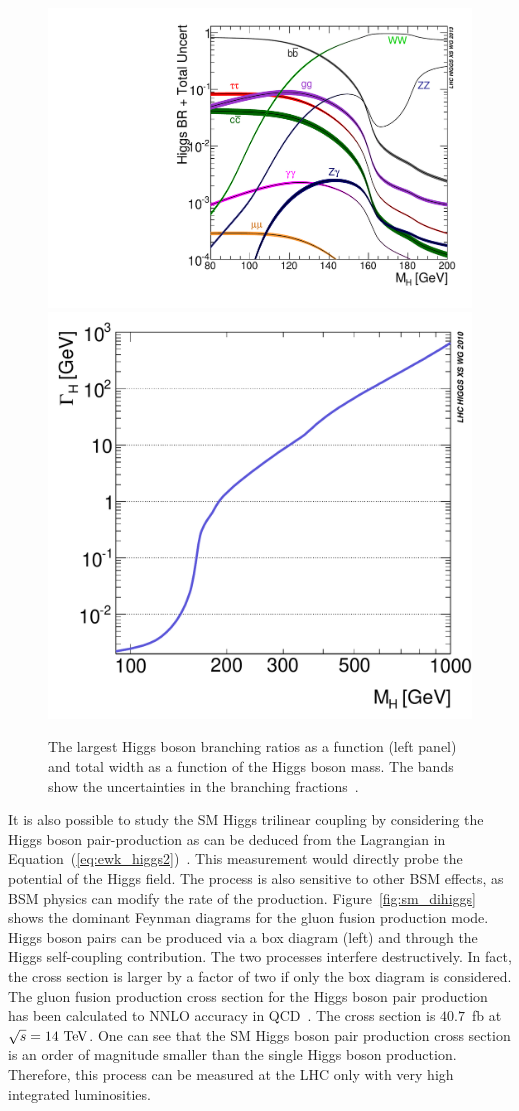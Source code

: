 \begin{figure}[h]
\centering
\includegraphics[width=0.49\columnwidth]{figures_chapter2/Higgs_BR_LM}
\includegraphics[width=0.49\columnwidth]{figures_chapter2/YRHXS_BR_fig2}
\caption{The largest Higgs boson branching ratios as a function (left panel) and total width as a function of the Higgs boson mass. The bands show the uncertainties in the branching fractions~\cite{Dittmaier:2011ti,Dittmaier:2012vm,Heinemeyer:2013tqa}.} 
\label{fig:higgs_decay}
\end{figure} 

It is also possible to study the SM Higgs trilinear coupling by considering the Higgs boson pair-production as can be deduced from the Lagrangian in Equation~(\ref{eq:ewk_higgs2})~\cite{Glover:1987nx,Plehn:1996wb,Djouadi:1999rca,Gianotti:2002xx,Baur:2003gpa,Baur:2003gp,Baglio:2012np}. This measurement would directly probe the potential of the Higgs field. The process is also sensitive to other BSM effects, as BSM physics can modify the rate of the production. Figure~\ref{fig:sm_dihiggs} shows the dominant Feynman diagrams for the gluon fusion production mode. Higgs boson pairs can be produced via a box diagram (left) and through the Higgs self-coupling contribution. The two processes interfere destructively. In fact, the cross section is larger by a factor of two if only the box diagram is considered. The gluon fusion production cross section for the Higgs boson pair production has been calculated to NNLO accuracy in QCD~\cite{Dawson:1998py,Grigo:2014jma}. The cross section is $40.7$~fb at $\sqrt{s}=14~\mathrm{Te\kern -0.1em V}$. One can see that the SM Higgs boson pair production cross section is an order of magnitude smaller than the single Higgs boson production. Therefore, this process can be measured at the LHC only with very high integrated luminosities.

